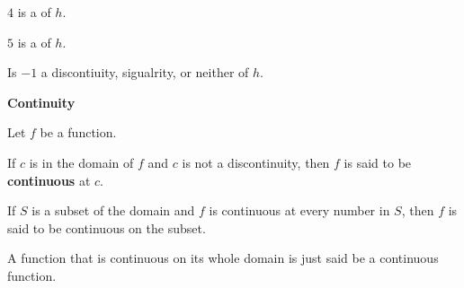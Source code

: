 \documentclass{ximera}
\begin{document}
\begin{example}
\begin{question}
$4$ is a  of $h$.


\end{question}





\begin{question}

$5$ is a  of $h$.


\end{question}





\begin{question}

Is $-1$ a discontiuity, sigualrity, or neither of $h$.

\begin{multipleChoice}
\end{multipleChoice}


\end{question}







\end{example}






\begin{definition} \textbf{\textcolor{green!50!black}{Continuity}} 


Let $f$ be a function.  

If $c$ is in the domain of $f$ and $c$ is not a discontinuity, then $f$ is said to be \textbf{continuous} at $c$. 


If $S$ is a subset of the domain and $f$ is continuous at every number in $S$, then $f$ is said to be continuous on the subset. 

A function that is continuous on its whole domain is just said be a continuous function. 


\end{definition}
\end{document}
